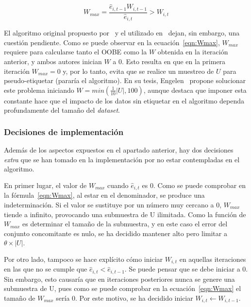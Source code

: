\begin{equation}\label{eqn:Wmax} W_{max} = \frac{\hat{e}_{i,t-1}W_{i,t-1}}{\hat{e}_{i, t}} > W_{i,t} \end{equation}


\label{parag:Wmax_inicial} El algoritmo original propuesto por~\cite{originalCoForest2007} y el utilizado en~\cite{zhou2021SemisupervisedRecommendationAttack} dejan, sin embargo, una cuestión pendiente. Como se puede observar en la ecuación~\ref{eqn:Wmax}, $W_{max}$ requiere para calcularse tanto el OOBE como la $W$ obtenida en la iteración anterior, y ambos autores inician $W$ a 0. Esto resulta en que en la primera iteración $W_{max} = 0$ y, por lo tanto, evita que se realice un muestreo de $U$ para pseudo-etiquetar (pararía el algoritmo). En su tesis, Engelen~\cite{engelen2018thesis} propone solucionar este problema iniciando $W = min(\frac{1}{10}|U|, 100)$, aunque destaca que imponer esta constante hace que el impacto de los datos sin etiquetar en el algoritmo dependa profundamente del tamaño del \textit{dataset}.


\subsubsection{Decisiones de implementación}

Además de los aspectos expuestos en el apartado anterior, hay dos decisiones \textit{extra} que se han tomado en la implementación por no estar contempladas en el algoritmo.

En primer lugar, el valor de $W_{max}$ cuando $\hat{e}_{i, t}$  es $0$. Como se puede comprobar en la fórmula~\ref{eqn:Wmax}, al estar en el denominador, se produce una indeterminación. Si el valor se sustituye por un número muy cercano a 0, $W_{max}$ tiende a infinito, provocando una submuestra de U ilimitada. Como la función de $W_{max}$ es determinar el tamaño de la submuestra, y en este caso el error del conjunto concomitante es nulo, se ha decidido mantener alto pero limitar a $\theta\times|U|$.

Por otro lado, tampoco se hace explícito cómo iniciar $W_{i,t}$ en aquellas iteraciones en las que no se cumple que $\hat{e}_{i,t} < \hat{e}_{i,t-1}$. Se puede pensar que se debe iniciar a 0. Sin embargo, esto causaría que en iteraciones posteriores nunca se genere una submuestra de U, pues como se puede comprobar en la ecuación~\ref{eqn:Wmax} el tamaño de $W_{max}$ sería $0$. Por este motivo, se ha decidido iniciar $W_{i,t} \leftarrow W_{i,t-1}$.

